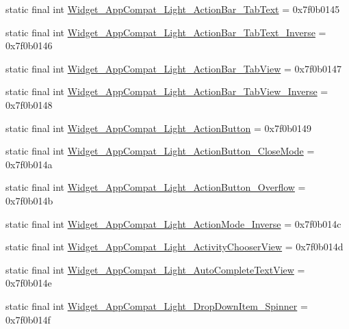\begin{CompactItemize}
static final int \hyperlink{classandroid_1_1support_1_1graphics_1_1drawable_1_1_r_1_1style_015d2d115d81bcc19db106363ec609b2}{Widget\_\-AppCompat\_\-Light\_\-ActionBar\_\-TabText} = 0x7f0b0145
\item 
static final int \hyperlink{classandroid_1_1support_1_1graphics_1_1drawable_1_1_r_1_1style_130c57938a52983de2955ff2181f82c9}{Widget\_\-AppCompat\_\-Light\_\-ActionBar\_\-TabText\_\-Inverse} = 0x7f0b0146
\item 
static final int \hyperlink{classandroid_1_1support_1_1graphics_1_1drawable_1_1_r_1_1style_ad141223148acedc8be461bb61b67876}{Widget\_\-AppCompat\_\-Light\_\-ActionBar\_\-TabView} = 0x7f0b0147
\item 
static final int \hyperlink{classandroid_1_1support_1_1graphics_1_1drawable_1_1_r_1_1style_24b05d051df932ca36153e3292f20e15}{Widget\_\-AppCompat\_\-Light\_\-ActionBar\_\-TabView\_\-Inverse} = 0x7f0b0148
\item 
static final int \hyperlink{classandroid_1_1support_1_1graphics_1_1drawable_1_1_r_1_1style_84ff3de92cb72618606873fedd372678}{Widget\_\-AppCompat\_\-Light\_\-ActionButton} = 0x7f0b0149
\item 
static final int \hyperlink{classandroid_1_1support_1_1graphics_1_1drawable_1_1_r_1_1style_9b748821716390970e4edebb8931c5da}{Widget\_\-AppCompat\_\-Light\_\-ActionButton\_\-CloseMode} = 0x7f0b014a
\item 
static final int \hyperlink{classandroid_1_1support_1_1graphics_1_1drawable_1_1_r_1_1style_11e02f02e098713a27dc62e29693cb39}{Widget\_\-AppCompat\_\-Light\_\-ActionButton\_\-Overflow} = 0x7f0b014b
\item 
static final int \hyperlink{classandroid_1_1support_1_1graphics_1_1drawable_1_1_r_1_1style_738fb194af3512c984f95d1d78b88f50}{Widget\_\-AppCompat\_\-Light\_\-ActionMode\_\-Inverse} = 0x7f0b014c
\item 
static final int \hyperlink{classandroid_1_1support_1_1graphics_1_1drawable_1_1_r_1_1style_b9ce1a65eaa66be6819a64638f2eff02}{Widget\_\-AppCompat\_\-Light\_\-ActivityChooserView} = 0x7f0b014d
\item 
static final int \hyperlink{classandroid_1_1support_1_1graphics_1_1drawable_1_1_r_1_1style_3b0fdfe7913a6066c10ee96cf71ab115}{Widget\_\-AppCompat\_\-Light\_\-AutoCompleteTextView} = 0x7f0b014e
\item 
static final int \hyperlink{classandroid_1_1support_1_1graphics_1_1drawable_1_1_r_1_1style_81c3b633301644ea0187a22093338862}{Widget\_\-AppCompat\_\-Light\_\-DropDownItem\_\-Spinner} = 0x7f0b014f

\end{CompactItemize}
